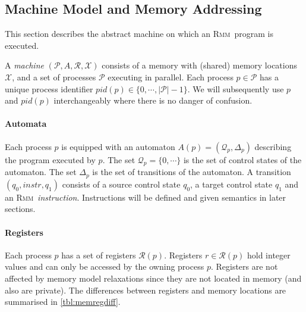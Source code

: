\documentclass[a4paper]{article}
\newcommand{\rmm}{\textsc{Rmm}}
\begin{document}
\subsection{Machine Model and Memory Addressing}\label{sec:abstmachinememaddr}

This section describes the abstract machine on which an \rmm\ program is
executed.

\newcommand{\vars}{\mathcal{X}} %
\newcommand{\procs}{\mathcal{P}} %
\newcommand{\automata}{A} %
\newcommand{\pautomaton}[1]{A(#1)} %
\newcommand{\regs}{\mathcal{R}} %
\newcommand{\pregs}[1]{\mathcal{R}(#1)} %
\newcommand{\pcstates}[1]{\mathcal{Q}_{#1}} %
\newcommand{\ptransitions}[1]{\Delta_{#1}} %


A \emph{machine} $(\procs,\automata,\regs,\vars)$ consists of a memory
with (shared) memory locations $\vars$, and a set of processes
$\procs$ executing in parallel. Each process $p\in\procs$ has a unique
process identifier $pid(p) \in \{0,\cdots,|\procs|-1\}$. We will
subsequently use $p$ and $pid(p)$ interchangeably where there is no
danger of confusion.

\paragraph{Automata}
Each process $p$ is equipped with an automaton $\pautomaton{p} =
(\pcstates{p},\ptransitions{p})$ describing the program executed by
$p$. The set $\pcstates{p} = \{0,\cdots\}$ is the set of control
states of the automaton. The set $\ptransitions{p}$ is the set of
transitions of the automaton. A transition $(q_0,instr,q_1)$ consists
of a source control state $q_0$, a target control state $q_1$ and an
\rmm\ \emph{instruction}. Instructions will be defined and given
semantics in later sections.

\paragraph{Registers}
Each process $p$ has a set of registers $\pregs{p}$. Registers
$r\in\pregs{p}$ hold integer values and can only be accessed by the
owning process $p$. Registers are not affected by memory model
relaxations since they are not located in memory (and also are
private). The differences between registers and memory locations are
summarised in \cref{tbl:memregdiff}.
\end{document}
